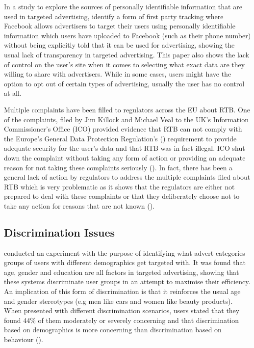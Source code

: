 \documentclass{l4proj}
\begin{document}
In a study to explore the sources of personally identifiable information that are used in targeted advertising, \cite{Venkatadri2019} identify a form of first party tracking where Facebook allows advertisers to target their users using personally identifiable information which users have uploaded to Facebook (such as their phone number) without being explicitly told that it can be used for advertising, showing the usual lack of transparency in targeted advertising. This paper also shows the lack of control on the user's site when it comes to selecting what exact data are they willing to share with advertisers. While in some cases, users might have the option to opt out of certain types of advertising, usually the user has no control at all.

Multiple complaints have been filled to regulators across the EU about RTB. One of the complaints, filed by Jim Killock and Michael Veal to the UK's Information Commissioner's Office (ICO) provided evidence that RTB can not comply with the Europe’s General Data Protection Regulation's (\cite{gdpr}) requirement to provide adequate security for the user's data and that RTB was in fact illegal. ICO shut down the complaint without taking any form of action or providing an adequate reason for not taking these complaints seriously (\cite{rtbcomplaint}). In fact, there has been a general lack of action by regulators to address the multiple complaints filed about RTB which is very problematic as it shows that the regulators are either not prepared to deal with these complaints or that they deliberately choose not to take any action for reasons that are not known (\cite{report}).

\subsection{Discrimination Issues}
\cite{Bol2019a} conducted an experiment with the purpose of identifying what advert categories groups of users with different demographics get targeted with. It was found that age, gender and education are all factors in targeted advertising, showing that these systems discriminate user groups in an attempt to maximise their efficiency. An implication of this form of discrimination is that it reinforces the usual age and gender stereotypes (e.g men like cars and women like beauty products). When presented with different discrimination scenarios, users stated that they found 44\% of them moderately or severely concerning and that discrimination based on demographics is more concerning than discrimination based on behaviour (\cite{Plane2017}).
\end{document}
